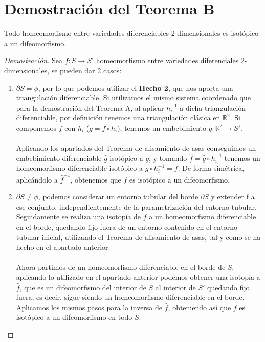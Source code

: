 \section{Demostración del Teorema B}
	\begin{teorb}
		Todo homeomorfismo entre variedades diferenciables 2-dimensionales es isotópico a un difeomorfismo.
	\end{teorb}
	\begin{proof}[Demostración]
		Sea $f: S \rightarrow S'$ homeomorfismo entre variedades diferenciales 2-dimensionales, se pueden dar 2 casos:
		\begin{enumerate}
			\item $\partial S = \phi$, por lo que podemos utilizar el \textbf{Hecho 2}, que nos aporta una triangulación diferenciable. Si utilizamos el mismo sistema coordenado que para la demostración del Teorema A, al aplicar $h_i^{-1}$ a dicha triangulación diferenciable, por definición tenemos una triangulación clásica en $\mathbb{R}^2$. Si componemos $f$ con $h_i$ ($g=f\circ h_i$), tenemos un embebimiento $g: \mathbb{R}^2 \rightarrow S'$.\\
			\\ Aplicando los apartados del Teorema de alisamiento de asas conseguimos un embebimiento diferenciable $\widehat{g}$ isotópico a $g$, y tomando $\widehat{f}=\widehat{g}\circ h_i^{-1}$ tenemos un homeomorfismo diferenciable isotópico a $g\circ h_i^{-1}=f$. De forma simétrica, aplicándolo a $\widehat{f}^{-1}$, obtenemos que $f$ es isotópico a un difeomorfismo. 
			\item $\partial S \neq \phi$, podemos considerar un entorno tubular del borde $\partial S$ y extender f a ese conjunto, independientemente de la parametrización del entorno tubular. Seguidamente se realiza una isotopía de $f$ a un homeomorfismo diferenciable en el borde, quedando fijo fuera de un entorno contenido en el entorno tubular inicial, utilizando el Teorema de alisamiento de asas, tal y como se ha hecho en el apartado anterior.\\
			\\ Ahora partimos de un homeomorfismo diferenciable en el borde de $S$, aplicando lo utilizado en el apartado anterior podemos obtener una isotopía a $\widehat{f}$, que es un difeomorfismo del interior de $S$ al interior de $S'$ quedando fijo fuera, es decir, sigue siendo un homeomorfismo diferenciable en el borde. Aplicamos los mismos pasos para la inversa de $\widehat{f}$, obteniendo así que $f$ es isotópico a un difeomorfismo en todo $S$.
		\end{enumerate}
	\end{proof}
\endinput
